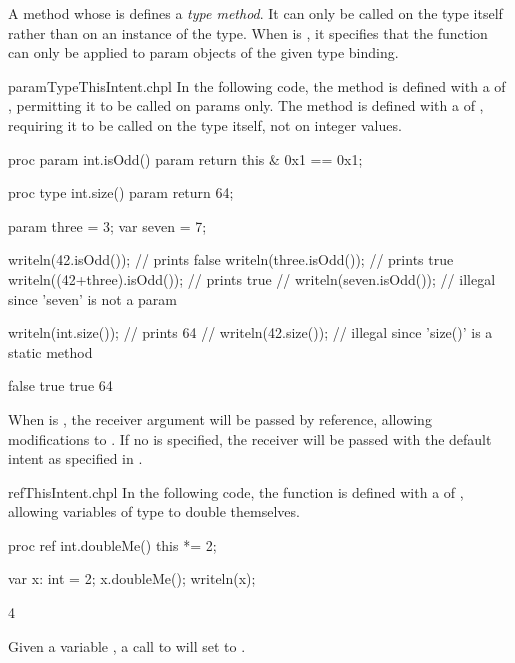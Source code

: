 A method whose  is  defines a \emph{type
method}.  It can only be called on the type itself rather than on an
instance of the type.  When  is , it
specifies that the function can only be applied to param objects of
the given type binding.

\begin{chapelexample}{paramTypeThisIntent.chpl}
In the following code, the  method is defined with
a  of , permitting it to be called on
params only.  The  method is defined with
a  of , requiring it to be called on
the  type itself, not on integer values.
\begin{chapel}
proc param int.isOdd() param {
  return this & 0x1 == 0x1;
}

proc type int.size() param {
  return 64;
}

param three = 3;
var seven = 7;

writeln(42.isOdd());          // prints false
writeln(three.isOdd());       // prints true
writeln((42+three).isOdd());  // prints true
// writeln(seven.isOdd());    // illegal since 'seven' is not a param

writeln(int.size());          // prints 64
// writeln(42.size());        // illegal since 'size()' is a static method
\end{chapel}
\begin{chapeloutput}
false
true
true
64
\end{chapeloutput}
\end{chapelexample}

When  is , the receiver argument will be
passed by reference, allowing modifications to .  If
no  is specified, the receiver will be passed with
the default intent as specified in .

\begin{chapelexample}{refThisIntent.chpl}
In the following code, the  function is defined with a
 of , allowing variables of type  to
double themselves.
\begin{chapel}
proc ref int.doubleMe() { this *= 2; }
\end{chapel}
\begin{chapelpost}
var x: int = 2;
x.doubleMe();
writeln(x);
\end{chapelpost}
\begin{chapeloutput}
4
\end{chapeloutput}
Given a variable , a call to  will set 
to .
\end{chapelexample}

